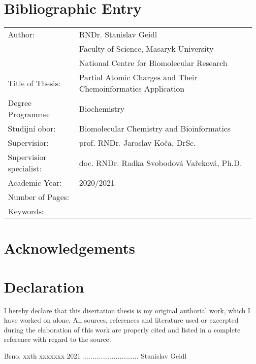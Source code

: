 \documentclass[12pt,a4paper,oneside,final]{book}
\begin{document}
\vfill
\section*{Bibliographic Entry}
\begin{tabular}{ ll } 
  Author:                 & RNDr. Stanislav Geidl \\
                          & Faculty of Science, Masaryk University \\
                          & National Centre for Biomolecular Research \\
  Title of Thesis:        & Partial Atomic Charges and Their Chemoinformatics Application \\ 
  Degree Programme:       & Biochemistry \\
  Studijní obor:          & Biomolecular Chemistry and Bioinformatics \\
  Supervisior:            & prof. RNDr. Jaroslav Koča, DrSc. \\
  Supervisior specialist: & doc. RNDr. Radka Svobodová Vařeková, Ph.D. \\
  Academic Year:          & 2020/2021 \\
  Number of Pages:        & \\
  Keywords:               & \\
\end{tabular}
\clearpage

\pagestyle{plain}
\vspace*{18cm}
\section*{Acknowledgements}



\clearpage
\vspace*{18cm}
\section*{Declaration}
I hereby declare that this disertation thesis is my original authorial work,
which I have worked on alone. All sources, references and literature used or
excerpted during the elaboration of this work are properly cited and listed
in a complete reference with regard to the source.

Brno, xxth xxxxxxx 2021 ............................. Stanislav Geidl


\clearpage
\tableofcontents
\end{document}
